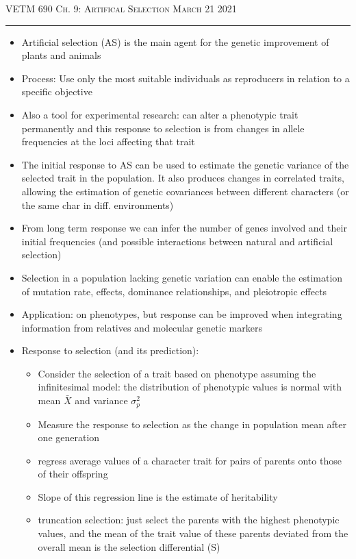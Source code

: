 \documentclass[12pt]{amsart}
\begin{document}
\thispagestyle{empty}

{\scshape VETM 690} \hfill {\scshape \Large  Ch. 9: Artifical Selection} \hfill {\scshape March 21 2021}
\medskip
\hrule
\bigskip

\begin{itemize}
\item Artificial selection (AS) is the main agent for the genetic improvement of plants and animals
\item Process: Use only the most suitable individuals as reproducers in relation to a specific objective
\item Also a tool for experimental research: can alter a phenotypic trait permanently and this response to selection is from changes in allele frequencies at the loci affecting that trait
\item The initial response to AS can be used to estimate the genetic variance of the selected trait in the population. It also produces changes in correlated traits, allowing the estimation of genetic covariances between different characters (or the same char in diff. environments)
\item From long term response we can infer the number of genes involved and their initial frequencies (and possible interactions between natural and artificial selection)
\item Selection in a population lacking genetic variation can enable the estimation of mutation rate, effects, dominance relationships, and pleiotropic effects 
\item Application: on phenotypes, but response can be improved when integrating information from relatives and molecular genetic markers
\item Response to selection (and its prediction):
\begin{itemize}
\item Consider the selection of a trait based on phenotype assuming the infinitesimal model: the distribution of phenotypic values is normal with mean $\bar{X}$ and variance $\sigma_p^2$ 
\item Measure the response to selection as the change in population mean after one generation
\item regress average values of a character trait for pairs of parents onto those of their offspring
\item Slope of this regression line is the estimate of heritability 
\item truncation selection: just select the parents with the highest phenotypic values, and the mean of the trait value of these parents deviated from the overall mean is the selection differential (S) 

\end{itemize}
\end{itemize}
\end{document}

